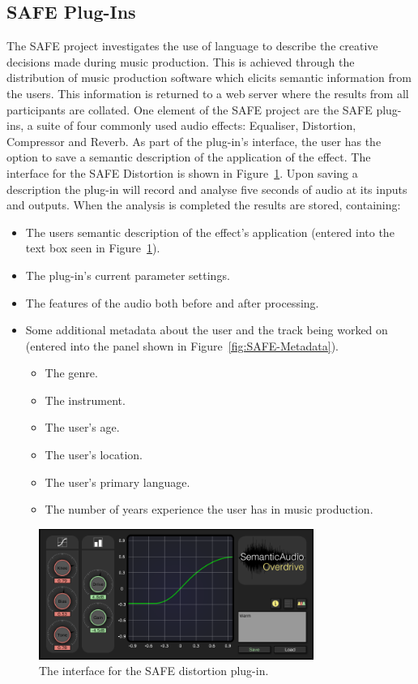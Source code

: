 	\subsection{SAFE Plug-Ins}
	\label{sec:TimbreEvaluation-DAWBasedTimbreEvaluation-SAFE}
		The SAFE project \citep{stables2014safe} investigates the use of language to describe the creative
		decisions made during music production. This is achieved through the distribution of music production
		software which elicits semantic information from the users. This information is returned to a web server
		where the results from all participants are collated. One element of the SAFE project are the SAFE
		plug-ins, a suite of four commonly used audio effects: Equaliser, Distortion, Compressor and Reverb. As
		part of the plug-in's interface, the user has the option to save a semantic description of the application
		of the effect. The interface for the SAFE Distortion is shown in Figure~\ref{fig:SAFE-Distortion}. Upon
		saving a description the plug-in will record and analyse five seconds of audio at its inputs and outputs.
		When the analysis is completed the results are stored, containing:

		\begin{itemize}
			\item The users semantic description of the effect's application (entered into the text box seen in
				Figure~\ref{fig:SAFE-Distortion}).
			\item The plug-in's current parameter settings.
			\item The features of the audio both before and after processing.
			\item Some additional metadata about the user and the track being worked on (entered into the panel
				shown in Figure~\ref{fig:SAFE-Metadata}).
			\begin{itemize}
				\item The genre.
				\item The instrument.
				\item The user's age.
				\item The user's location.
				\item The user's primary language.
				\item The number of years experience the user has in music production.
			\end{itemize}
		\end{itemize}

		\begin{figure}[h!]
			\centering
			\includegraphics[width=0.8\textwidth]{chapter4/Images/SAFEDistortion.png}
			\caption{The interface for the SAFE distortion plug-in.}
			\label{fig:SAFE-Distortion}
		\end{figure}

